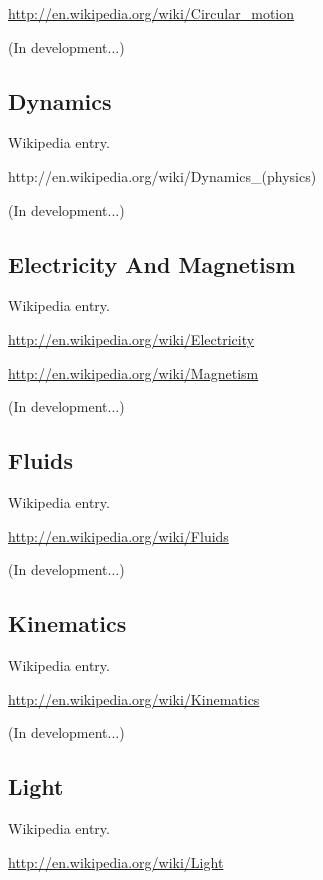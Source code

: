 \documentclass[12pt,oneside]{book}
\begin{document}
\href{http://en.wikipedia.org/wiki/Circular_motion}{http://en.wikipedia.org/wiki/Circular\_motion}

(In development...)

\subsection[Dynamics]{Dynamics}

Wikipedia entry.

http://en.wikipedia.org/wiki/Dynamics\_(physics)

(In development...)

\subsection[Electricity And Magnetism]{Electricity And Magnetism}

Wikipedia entry.

\href{http://en.wikipedia.org/wiki/Electricity}{http://en.wikipedia.org/wiki/Electricity}


\href{http://en.wikipedia.org/wiki/Magnetism}{http://en.wikipedia.org/wiki/Magnetism}

(In development...)

\subsection[Fluids]{Fluids}

Wikipedia entry.

\href{http://en.wikipedia.org/wiki/Fluids}{http://en.wikipedia.org/wiki/Fluids}

(In development...)

\subsection[Kinematics]{Kinematics}

Wikipedia entry.

\href{http://en.wikipedia.org/wiki/Kinematics}{http://en.wikipedia.org/wiki/Kinematics}

(In development...)

\subsection[Light]{Light}

Wikipedia entry.

\href{http://en.wikipedia.org/wiki/Light}{http://en.wikipedia.org/wiki/Light}
\end{document}
